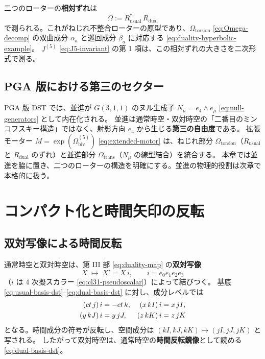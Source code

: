 \documentclass[dvipdfmx,a4paper,oneside]{jsbook}
\numberwithin{equation}{chapter}
\begin{document}
二つのローターの\textbf{相対ずれ}は
\begin{equation}
  \Omega := R_{\mathrm{usual}}^\dagger\, R_{\mathrm{dual}}
  \label{eq:torsion-rotor-preview}
\end{equation}
で測られる。これがねじれ不整合ローターの原型であり、\(\Omega_{\mathrm{torsion}}\) \eqref{eq:Omega-decomp} の双曲成分 \(\alpha_a\) と巡回成分 \(\beta_a\) に対応する \eqref{eq:duality-hyperbolic-example}。
\(J^{(5)}\) \eqref{eq:J5-invariant} の第 1 項は、この相対ずれの大きさを二次形式で測る。

\subsection{PGA 版における第三のセクター}

PGA 版 DST では、並進が \(G(3,1,1)\) のヌル生成子 \(N_\mu = e_4 \wedge e_\mu\) \eqref{eq:null-generators} として内在化される。
並進は通常時空・双対時空の「二番目のミンコフスキー構造」ではなく、射影方向 \(e_4\) から生じる\textbf{第三の自由度}である。
拡張モーター \(M = \exp(\Omega_{\mathrm{biv}}^{(5)})\) \eqref{eq:extended-motor} は、ねじれ部分 \(\Omega_{\mathrm{torsion}}\)（\(R_{\mathrm{usual}}\) と \(R_{\mathrm{dual}}\) のずれ）と並進部分 \(\Omega_{\mathrm{trans}}\)（\(N_\mu\) の線型結合）を統合する。
本章では並進を脇に置き、二つのローターの構造を明確にする。並進の物理的役割は次章で本格的に扱う。

\section{コンパクト化と時間矢印の反転}

\subsection{双対写像による時間反転}

通常時空と双対時空は、第 III 部 \eqref{eq:duality-map} の\textbf{双対写像}
\begin{equation}
  X \;\longmapsto\; X' = X\, i,
  \qquad i = e_0 e_1 e_2 e_3
  \label{eq:duality-map-chapter}
\end{equation}
（\(i\) は 4 次擬スカラー \eqref{eq:cl31-pseudoscalar}）によって結びつく。
基底 \eqref{eq:usual-basis-dst}–\eqref{eq:dual-basis-dst} に対し、成分レベルでは
\begin{align}
  (ct\, j)\, i &= -ct\, k, &
  (x\, kI)\, i &= x\, jI, \notag\\
  (y\, kJ)\, i &= y\, jJ, &
  (z\, kK)\, i &= z\, jK
  \label{eq:duality-basis-action}
\end{align}
となる。時間成分の符号が反転し、空間成分は \((kI,kJ,kK) \mapsto (jI,jJ,jK)\) と写される。
したがって双対時空は、通常時空の\textbf{時間反転鏡像}として読める \eqref{eq:dual-basis-dst}。
\end{document}
